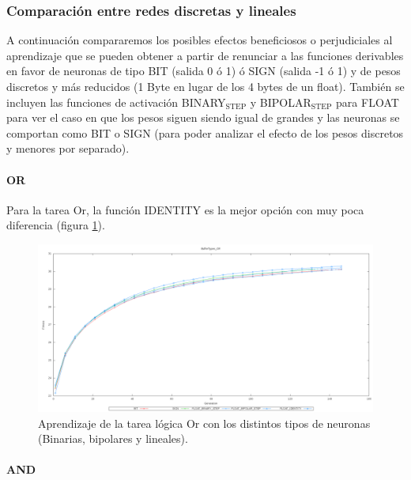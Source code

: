 \documentclass[11pt]{article}
\begin{document}
\begin{titlepage}
\newpage
\subsubsection{Comparaci\'on entre redes discretas y lineales}
\label{sec-6-2-2}

   \label{aprendDiscretLineales}

A continuación compararemos los posibles efectos beneficiosos o perjudiciales al aprendizaje que se pueden obtener a partir de renunciar a las funciones derivables en favor de neuronas de tipo BIT (salida 0 ó 1) ó SIGN (salida -1 ó 1) y de pesos discretos y más reducidos (1 Byte en lugar de los 4 bytes de un float). También se incluyen las funciones de activación BINARY$_{\mathrm{STEP}}$ y BIPOLAR$_{\mathrm{STEP}}$ para FLOAT para ver el caso en que los pesos siguen siendo igual de grandes y las neuronas se comportan como BIT o SIGN (para poder analizar el efecto de los pesos discretos y menores por separado).
\paragraph{OR}
\label{sec-6-2-2-1}


Para la tarea Or, la función IDENTITY es la mejor opción con muy poca diferencia (figura \ref{aprenDiscretOr}).

\begin{figure}[htb]
\centering
\includegraphics[width=\textwidth]{./img/BufferTypes_OR.png}
\caption{\label{aprenDiscretOr}Aprendizaje de la tarea lógica Or con los distintos tipos de neuronas (Binarias, bipolares y lineales).}
\end{figure}

\newpage
\paragraph{AND}
\label{sec-6-2-2-2}



\end{titlepage}
\end{document}
